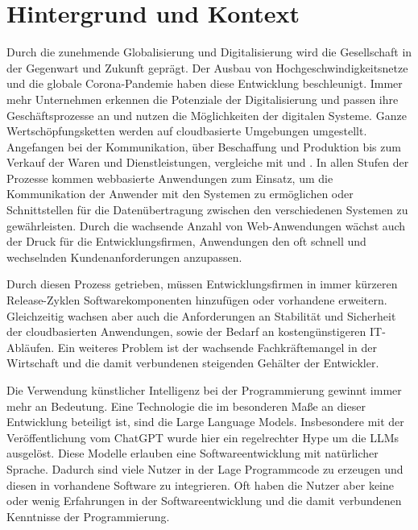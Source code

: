 \section{Hintergrund und Kontext}
Durch die zunehmende Globalisierung und Digitalisierung wird die Gesellschaft in der Gegenwart und Zukunft geprägt. Der Ausbau von Hochgeschwindigkeitsnetze und die globale Corona-Pandemie haben diese Entwicklung beschleunigt. Immer mehr Unternehmen erkennen die Potenziale der Digitalisierung und passen ihre Geschäftsprozesse an und nutzen die Möglichkeiten der digitalen Systeme. Ganze Wertschöpfungsketten werden auf cloudbasierte Umgebungen umgestellt. Angefangen bei der Kommunikation, über Beschaffung und Produktion bis zum Verkauf der Waren und Dienstleistungen, vergleiche mit \parencite[Seite 21 ff.]{banholzer-2020} und \cite{oswald-2022}. In allen Stufen der Prozesse kommen webbasierte Anwendungen zum Einsatz, um die Kommunikation der Anwender mit den Systemen zu ermöglichen oder Schnittstellen für die Datenübertragung zwischen den verschiedenen Systemen zu gewährleisten. Durch die wachsende Anzahl von Web-Anwendungen wächst auch der Druck für die Entwicklungsfirmen, Anwendungen den oft schnell und wechselnden Kundenanforderungen anzupassen.\vspace{0.2cm}

Durch diesen Prozess getrieben, müssen Entwicklungsfirmen in immer kürzeren Release-Zyklen Softwarekomponenten hinzufügen oder vorhandene erweitern. Gleichzeitig wachsen aber auch die Anforderungen an Stabilität und Sicherheit der cloudbasierten Anwendungen, sowie der Bedarf an kostengünstigeren IT-Abläufen. Ein weiteres Problem ist der wachsende Fachkräftemangel in der Wirtschaft und die damit verbundenen steigenden Gehälter der Entwickler.\vspace{0.2cm}

Die Verwendung künstlicher Intelligenz bei der Programmierung gewinnt immer mehr an Bedeutung. Eine Technologie die im besonderen Maße an dieser Entwicklung beteiligt ist, sind die Large Language Models. Insbesondere mit der Veröffentlichung vom ChatGPT wurde hier ein regelrechter Hype um die \acrshort{LLM}s ausgelöst. Diese Modelle erlauben eine Softwareentwicklung mit natürlicher Sprache. Dadurch sind viele Nutzer in der Lage Programmcode zu erzeugen und diesen in vorhandene Software zu integrieren. Oft haben die Nutzer aber keine oder wenig Erfahrungen in der Softwareentwicklung und die damit verbundenen Kenntnisse der Programmierung.



